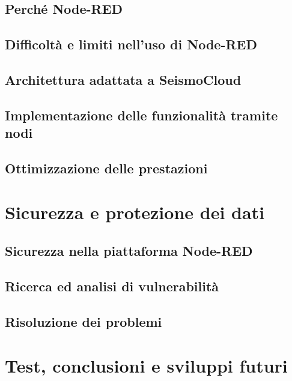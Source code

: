 \documentclass[a4paper,10pt]{memoir}
\begin{document}
\section{Perché Node-RED}

\section{Difficoltà e limiti nell'uso di Node-RED}

\section{Architettura adattata a SeismoCloud}

\section{Implementazione delle funzionalità tramite nodi}

\section{Ottimizzazione delle prestazioni}


\chapter{Sicurezza e protezione dei dati}

\section{Sicurezza nella piattaforma Node-RED}

\section{Ricerca ed analisi di vulnerabilità}

\section{Risoluzione dei problemi}


\chapter{Test, conclusioni e sviluppi futuri}
\end{document}
